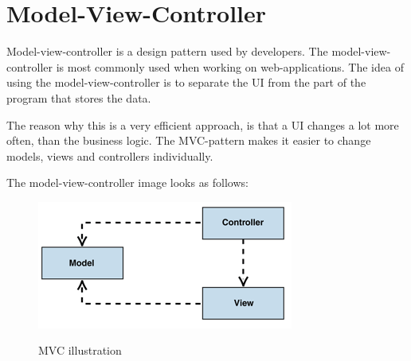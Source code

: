 \section{Model-View-Controller}

Model-view-controller is a design pattern used by developers. The 
model-view-controller is most commonly used when working on web-applications\cite{mvcasp}. 
The idea of using the model-view-controller is to separate the UI from the 
part of the program that stores the data\cite{modelviewcontroller}. 

The reason why this is a very efficient approach, is that a UI changes a lot more often, 
than the business logic. The MVC-pattern makes it easier to change 
models, views and controllers individually\cite{modelviewcontroller}.

The model-view-controller image looks as follows:

\begin{figure}[ht!]
	\centering
		\includegraphics{design/figures/model-view-controller.png}
	\label{fig:model-view-controller}
	\caption{MVC illustration\cite{modelviewcontroller}}
\end{figure}


